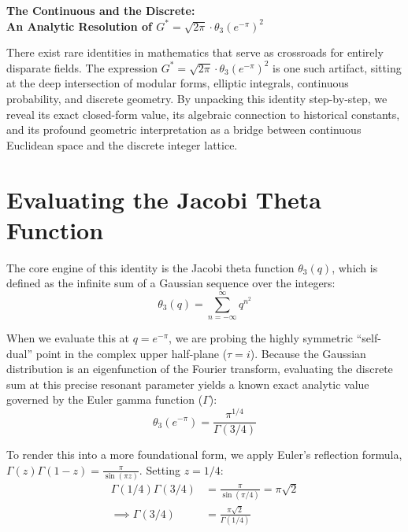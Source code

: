 \documentclass[11pt]{article}
\begin{document}
\begin{center}
    \LARGE\textbf{The Continuous and the Discrete:} \\[0.2cm]
    \large\textbf{An Analytic Resolution of $G^* = \sqrt{2\pi} \cdot \theta_3(e^{-\pi})^2$}
\end{center}

\vspace{0.4cm}

\noindent There exist rare identities in mathematics that serve as crossroads for entirely disparate fields. The expression $G^* = \sqrt{2\pi} \cdot \theta_3(e^{-\pi})^2$ is one such artifact, sitting at the deep intersection of modular forms, elliptic integrals, continuous probability, and discrete geometry. By unpacking this identity step-by-step, we reveal its exact closed-form value, its algebraic connection to historical constants, and its profound geometric interpretation as a bridge between continuous Euclidean space and the discrete integer lattice.

\section{Evaluating the Jacobi Theta Function}
The core engine of this identity is the Jacobi theta function $\theta_3(q)$, which is defined as the infinite sum of a Gaussian sequence over the integers:
\begin{equation}
    \theta_3(q) = \sum_{n=-\infty}^\infty q^{n^2}
\end{equation}

When we evaluate this at $q = e^{-\pi}$, we are probing the highly symmetric ``self-dual'' point in the complex upper half-plane ($\tau = i$). Because the Gaussian distribution is an eigenfunction of the Fourier transform, evaluating the discrete sum at this precise resonant parameter yields a known exact analytic value governed by the Euler gamma function ($\Gamma$):
\begin{equation}
    \theta_3(e^{-\pi}) = \frac{\pi^{1/4}}{\Gamma(3/4)}
\end{equation}

To render this into a more foundational form, we apply Euler's reflection formula, $\Gamma(z)\Gamma(1-z) = \frac{\pi}{\sin(\pi z)}$. Setting $z = 1/4$:
\begin{align}
    \Gamma(1/4)\Gamma(3/4) &= \frac{\pi}{\sin(\pi/4)} = \pi\sqrt{2} \nonumber \\[0.2cm]
    \implies \Gamma(3/4) &= \frac{\pi\sqrt{2}}{\Gamma(1/4)}
\end{align}
\end{document}
